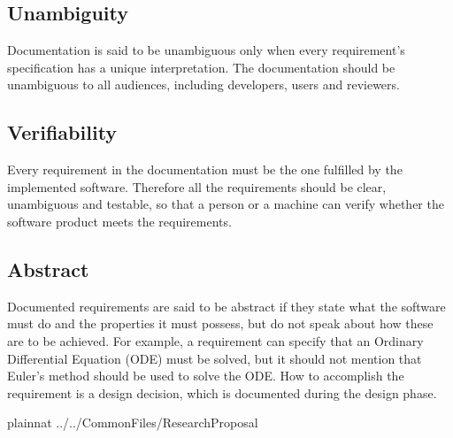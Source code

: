 \documentclass[12pt]{article}
\begin{document}
\subsection{Unambiguity}

Documentation is said to be unambiguous only when every requirement's
specification has a unique interpretation.  The documentation should be
unambiguous to all audiences, including developers, users and reviewers.

\subsection{Verifiability}

Every requirement in the documentation must be the one fulfilled by the
implemented software. Therefore all the requirements should be clear,
unambiguous and testable, so that a person or a machine can verify whether the
software product meets the requirements.

\subsection{Abstract}

Documented requirements are said to be abstract if they state what the software
must do and the properties it must possess, but do not speak about how these are
to be achieved. For example, a requirement can specify that an Ordinary
Differential Equation (ODE) must be solved, but it should not mention that
Euler's method should be used to solve the ODE. How to accomplish the
requirement is a design decision, which is documented during the design phase.

\newpage

 {plainnat}
 {../../CommonFiles/ResearchProposal}
\end{document}
